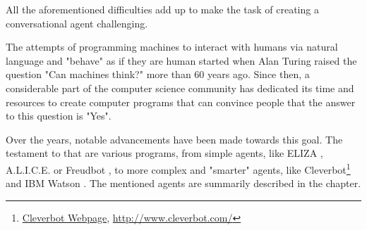 All the aforementioned difficulties add up to make the task of creating a conversational agent challenging.

The attempts of programming machines to interact with humans via natural language and "behave" as if they are human started when Alan Turing raised the question "Can machines think?" \cite{Turing1950} more than 60 years ago. Since then, a considerable part of the computer science community has dedicated its time and resources to create computer programs that can convince people that the answer to this question is "Yes".

Over the years, notable advancements have been made towards this goal. The testament to that are various programs, from simple agents, like ELIZA \cite{Weizenbaum1966}, A.L.I.C.E. \cite{Wallace2009} or Freudbot \cite{Heller2005}, to more complex and "smarter" agents, like Cleverbot\footnote{\href{http://www.cleverbot.com/}{Cleverbot Webpage}, \url{http://www.cleverbot.com/}} and IBM Watson \cite{Ferrucci2010}. The mentioned agents are summarily described in the  chapter.

\begin{comment}
\section{Natural Language Processing}
\label{sec:nlp}

Natural Language Processing (NLP)

\section{Conversational Agent}
\label{sec:intro-conversational-agent}

\section{Question Answering}
\label{sec:intro-qa}

Question Answering (QA)
\end{comment}




